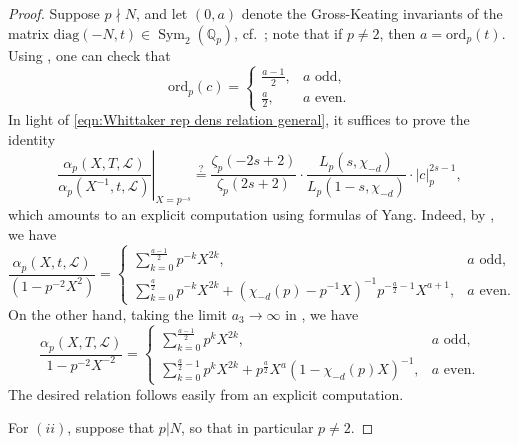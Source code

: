 \documentclass[reqno,oneside]{amsart}
\theoremstyle{plain}
\theoremstyle{remark}
\numberwithin{theorem}{section}
\newcommand{\bbQ}{\mathbb Q}
\newcommand{\calL}{\mathcal L}
\DeclareMathOperator{\Sym}{Sym}
\newcommand{\ord}{\mathrm{ord}}
\begin{document}
	\begin{proof}
		
		
		Suppose $p \nmid N$, and let $(0, a)$ denote the Gross-Keating invariants of the matrix $\mathrm{diag}(-N, t) \in \Sym_2(\bbQ_p)$, cf.\ \cite[Appendix B]{YangLocal2}; note that if $p \neq 2$, then $a = \ord_p(t)$.  Using \cite[Proposition B4]{YangLocal2}, one can check that
		\begin{equation}
		\ord_p(c) =
		\begin{cases}
		\frac{a-1}2, & a \text{ odd}, \\
		\frac{a}{2}, & a \text{ even.}
		\end{cases}
		\end{equation}
		In light of \eqref{eqn:Whittaker rep dens relation general}, it suffices to prove the identity
		\begin{equation}
		\left. \frac{\alpha_p(X, T, \calL)}{\alpha_p(X^{-1}, t, \calL)}\right|_{X = p^{-s}} \stackrel{?}{=}   \frac{ \zeta_p(-2s+2)}{\zeta_p(2s + 2)}\cdot \frac{ L_p(s, \chi_{-d})}{L_p(1-s, \chi_{-d})} \cdot |c|_p^{2s - 1},
		\end{equation}
		which amounts to an explicit computation using formulas of Yang. Indeed, by \cite[Proposition C2]{YangLocal2}, we have
		\begin{equation} \label{eqn:alpha rank 1}
		\frac{\alpha_p(X, t, \calL)}{(1-p^{-2}X^2)} =
		\begin{cases}
		\sum_{k=0}^{\frac{a-1}2}  p^{-k} X^{2k}, & a \text{ odd,} \\[10pt]
		\sum_{k=0}^{\frac{a}2}  p^{-k} X^{2k} + (\chi_{-d}(p) - p^{-1}X)^{-1} p^{-\frac{a}2-1}X^{a+1}, & a \text{ even.}
		\end{cases}
		\end{equation}
		On the other hand, taking the limit  $a_3 \to \infty$ in \cite[Theorem 5.7]{YangLocal2}, we have
		\begin{equation}
		\frac{\alpha_p(X,T,\calL)}{1- p^{-2}X^{-2}} =
		\begin{cases}
		\sum_{k=0}^{\frac{a-1}2}  p^{k} X^{2k}, & a \text{ odd,} \\[10pt]
		\sum_{k=0}^{\frac{a}2-1}  p^{k} X^{2k} + p^{\frac{a}2} X^a(1-\chi_{-d}(p)X)^{-1}, & a \text{ even.}
		\end{cases}
		\end{equation}
		The desired relation follows easily from an explicit computation.
		
		For $(ii)$, suppose that $p| N$, so that in particular $p \neq 2$.
		

\end{proof}
\end{document}
